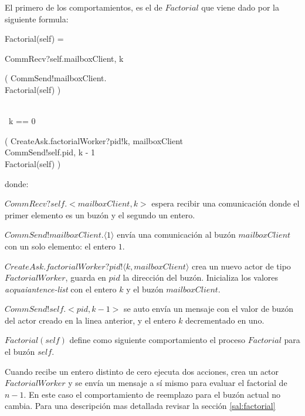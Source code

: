 El primero de los comportamientos, es el de $Factorial$ que viene dado por la siguiente formula:
\begin{process}
Factorial(self) = {} \\ \quad
  \begin{block}
  CommRecv?self.\langle mailboxClient, k \rangle \then {} \\ \quad
    \begin{block} \quad
      \begin{block} 
      ( CommSend!mailboxClient. \rangle \then \\
      Factorial(self) )
      \end{block} \\
     {} \lceil\ k == 0\ \rceil  \\ \quad
      \begin{block}
      ( CreateAsk.factorialWorker?pid!\langle k, mailboxClient \rangle \then \\
      CommSend!self.\langle pid, k - 1 \rangle \then \\
      Factorial(self) )
      \end{block}
    \end{block}
  \end{block}
\end{process}
donde:
\begin{description}
 \item $CommRecv?self.<mailboxClient, k>$ espera recibir una comunicación donde el primer elemento es un buzón y el segundo un entero.
 \item $CommSend!mailboxClient.\langle 1 \rangle$ envía una comunicación al buzón $mailboxClient$ con un solo elemento: el entero $1$.
 \item $CreateAsk.factorialWorker?pid!\langle k, mailboxClient \rangle$ crea un nuevo actor de tipo $FactorialWorker$, guarda en $pid$ la dirección del buzón. Inicializa los valores \textit{acquaiantence-list} con el entero $k$ y el buzón $mailboxClient$.
 \item $CommSend!self.<pid, k - 1 >$ se auto envía un mensaje con el valor de buzón del actor creado en la linea anterior, y el entero $k$ decrementado en uno.
 \item $Factorial(self)$ define como siguiente comportamiento el proceso $Factorial$ para el buzón $self$.
\end{description}

Cuando recibe un entero distinto de cero ejecuta dos acciones, crea un actor $FactorialWorker$ y se envía un mensaje a sí mismo para evaluar el factorial de $n - 1$. En este caso el comportamiento de reemplazo para el buzón actual no cambia. Para una descripción mas detallada revisar la sección \ref{sal:factorial}

